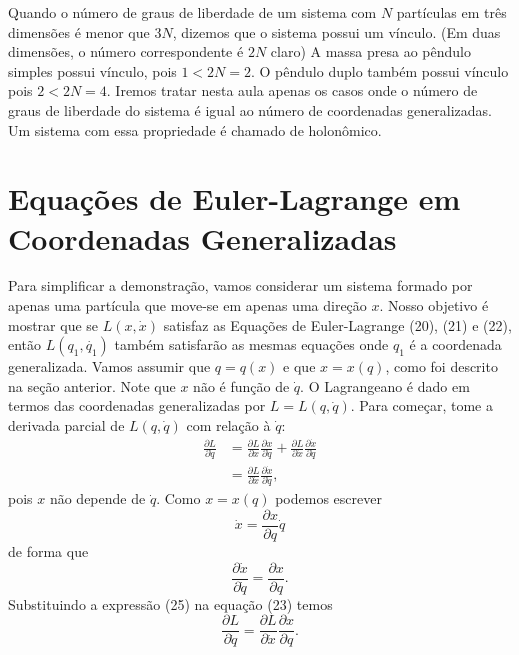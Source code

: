 \documentclass{article}
\begin{document}
Quando o número de graus de liberdade de um sistema com $N$ partículas em três dimensões é menor que $3N$, dizemos que o sistema possui um vínculo. (Em duas dimensões, o número correspondente é $2N$ claro) A massa presa ao pêndulo simples possui vínculo, pois $1 < 2N = 2$. O pêndulo duplo também possui vínculo pois $2 < 2N = 4$. Iremos tratar nesta aula apenas os casos onde o número de graus de liberdade do sistema é igual ao número de coordenadas generalizadas. Um sistema com essa propriedade é chamado de holonômico.

\section{Equações de Euler-Lagrange em Coordenadas Generalizadas}

Para simplificar a demonstração, vamos considerar um sistema formado por apenas uma partícula que move-se em apenas uma direção $x$. Nosso objetivo é mostrar que se $L(x,\dot{x})$ satisfaz as Equações de Euler-Lagrange (20), (21) e (22), então $L(q_1,\dot{q_1})$ também satisfarão as mesmas equações onde $q_1$ é a coordenada generalizada. Vamos assumir que $q = q(x)$ e que $x = x(q)$, como foi descrito na seção anterior. Note que $x$ não é função de $\dot{q}$. O Lagrangeano é dado em termos das coordenadas generalizadas por $L = L(q,\dot{q})$. Para começar, tome a derivada parcial de $L(q,\dot{q})$ com relação à $\dot{q}$:
\begin{equation}
\begin{split}
    \frac{\partial L}{\partial \dot{q}} &= \frac{\partial L}{\partial x} \frac{\partial x}{\partial \dot{q}}  + \frac{\partial L}{\partial \dot{x}} \frac{\partial \dot{x}}{\partial \dot{q}} \\
                                        &= \frac{\partial L}{\partial \dot{x}} \frac{\partial \dot{x}}{\partial \dot{q}},
    \end{split}
\end{equation}
pois $x$ não depende de $\dot{q}$. Como $x = x(q)$ podemos escrever
\begin{equation}
    \dot{x} = \frac{\partial x}{\partial q}\dot{q}
\end{equation}
de forma que
\begin{equation}
    \frac{\partial \dot{x}}{\partial \dot{q}} = \frac{\partial x}{\partial q}.
\end{equation}
Substituindo a expressão (25) na equação (23) temos
\begin{equation}
    \frac{\partial L}{\partial \dot{q}} = \frac{\partial L}{\partial \dot{x}}\frac{\partial x}{\partial q}.
\end{equation}
\end{document}
